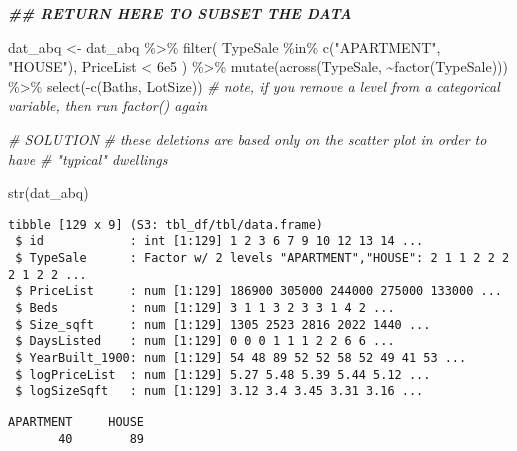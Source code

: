 \documentclass[
  12pt,
]{article}
\newenvironment{Shaded}{\begin{snugshade}}{\end{snugshade}}
\newcommand{\CommentTok}[1]{\textcolor[rgb]{0.56,0.35,0.01}{\textit{#1}}}
\newcommand{\DocumentationTok}[1]{\textcolor[rgb]{0.56,0.35,0.01}{\textbf{\textit{#1}}}}
\newcommand{\FloatTok}[1]{\textcolor[rgb]{0.00,0.00,0.81}{#1}}
\newcommand{\FunctionTok}[1]{\textcolor[rgb]{0.00,0.00,0.00}{#1}}
\newcommand{\NormalTok}[1]{#1}
\newcommand{\OtherTok}[1]{\textcolor[rgb]{0.56,0.35,0.01}{#1}}
\newcommand{\SpecialCharTok}[1]{\textcolor[rgb]{0.00,0.00,0.00}{#1}}
\newcommand{\StringTok}[1]{\textcolor[rgb]{0.31,0.60,0.02}{#1}}
\begin{document}
\begin{Shaded}
\begin{Highlighting}[]
\DocumentationTok{\#\# RETURN HERE TO SUBSET THE DATA}

\NormalTok{dat\_abq }\OtherTok{\textless{}{-}}
\NormalTok{  dat\_abq }\SpecialCharTok{\%\textgreater{}\%}
  \FunctionTok{filter}\NormalTok{(}
\NormalTok{    TypeSale }\SpecialCharTok{\%in\%} \FunctionTok{c}\NormalTok{(}\StringTok{"APARTMENT"}\NormalTok{, }\StringTok{"HOUSE"}\NormalTok{), }
\NormalTok{    PriceList }\SpecialCharTok{\textless{}} \FloatTok{6e5}
\NormalTok{  ) }\SpecialCharTok{\%\textgreater{}\%}
  \FunctionTok{mutate}\NormalTok{(}\FunctionTok{across}\NormalTok{(TypeSale, }\SpecialCharTok{\textasciitilde{}}\FunctionTok{factor}\NormalTok{(TypeSale))) }\SpecialCharTok{\%\textgreater{}\%}
  \FunctionTok{select}\NormalTok{(}\SpecialCharTok{{-}}\FunctionTok{c}\NormalTok{(Baths, LotSize))}
\CommentTok{\# note, if you remove a level from a categorical variable, then run factor() again}

  \CommentTok{\# SOLUTION}
  \CommentTok{\# these deletions are based only on the scatter plot in order to have}
  \CommentTok{\#  "typical" dwellings}

\FunctionTok{str}\NormalTok{(dat\_abq)}
\end{Highlighting}
\end{Shaded}

\begin{verbatim}
tibble [129 x 9] (S3: tbl_df/tbl/data.frame)
 $ id            : int [1:129] 1 2 3 6 7 9 10 12 13 14 ...
 $ TypeSale      : Factor w/ 2 levels "APARTMENT","HOUSE": 2 1 1 2 2 2 2 1 2 2 ...
 $ PriceList     : num [1:129] 186900 305000 244000 275000 133000 ...
 $ Beds          : num [1:129] 3 1 1 3 2 3 3 1 4 2 ...
 $ Size_sqft     : num [1:129] 1305 2523 2816 2022 1440 ...
 $ DaysListed    : num [1:129] 0 0 0 1 1 1 2 2 6 6 ...
 $ YearBuilt_1900: num [1:129] 54 48 89 52 52 58 52 49 41 53 ...
 $ logPriceList  : num [1:129] 5.27 5.48 5.39 5.44 5.12 ...
 $ logSizeSqft   : num [1:129] 3.12 3.4 3.45 3.31 3.16 ...
\end{verbatim}

\begin{Shaded}
\end{Shaded}

\begin{verbatim}
APARTMENT     HOUSE 
       40        89 
\end{verbatim}
\end{document}
